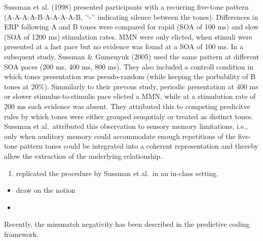 \documentclass[stu,a4paper,11pt,floatsintext]{apa7}
\providecommand{\tightlist}{%
  \setlength{\itemsep}{0pt}\setlength{\parskip}{0pt}}
\begin{document}
Sussman et al. (1998) presented participants with a recurring five-tone
pattern (A-A-A-A-B-A-A-A-A-B, '\enquote*{-}' indicating silence between
the tones). Differences in ERP following A and B tones were compared for
rapid (SOA of 100 ms) and slow (SOA of 1200 ms) stimulation rates. MMN
were only elicted, when stimuli were presented at a fast pace but no
evidence was found at a SOA of 100 ms. In a subsquent study, Sussman \&
Gumenyuk (2005) used the same pattern at different SOA paces (200 ms,
400 ms, 800 ms). They also included a controll condition in which tones
presentation was pseudo-random (while keeping the porbability of B tones
at 20\%). Simmilarly to their prevous study, periodic presentation at
400 ms or slower stimulus-to-stimulis pace elicted a MMN, while at a
stimulution rate of 200 ms such evidence was absent. They attributed
this to competing predicitve rules by which tones were either grouped
seuqntialy or treated as distinct tones. Sussman et al.~attributed this
observation to sensory memory limitations, i.e., only when auditory
memory could accommodate enough repetitions of the five-tone pattern
tones could be integrated into a coherent representation and thereby
allow the extraction of the underlying relationship.

\begin{enumerate}
\def\labelenumi{\arabic{enumi}.}
\tightlist
\item
  replicated the procedure by Sussman et al.~in an in-class setting.
\end{enumerate}

\begin{itemize}
\tightlist
\item
  draw on the notion
\item
\end{itemize}

Recently, the missmatch negativity has been described in the predictive
coding framework.
\end{document}

